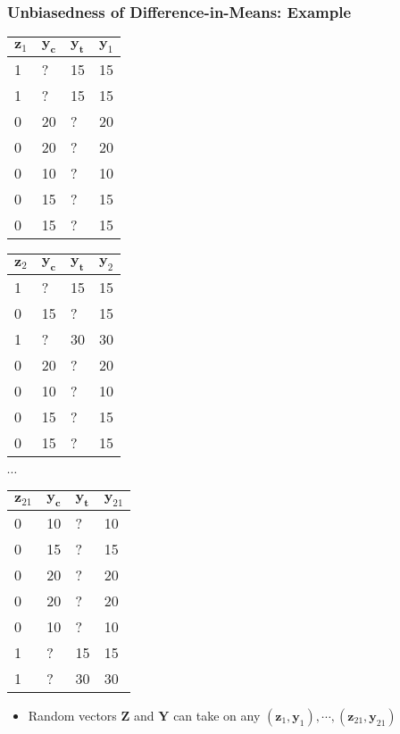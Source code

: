 \documentclass[table, xcolor = {dvipsnames}, 9pt]{beamer}
\theoremstyle{plain}
\begin{document}
\begin{frame}
\frametitle{Unbiasedness of Difference-in-Means: Example}
\begin{table}[H]
\scriptsize
    \begin{tabular}{l|l|l|l|}
    $\bm{z}_1$ & $\bm{y_c}$ & $\bm{y_t}$ & $\bm{y}_1$ \\ \midrule
    1 & ?  & 15  & 15 \\
    1 & ?  & 15  & 15 \\
    0 & 20 & ?   & 20 \\
    0 & 20 & ?   & 20 \\
    0 & 10 & ?   & 10 \\
    0 & 15 & ?   & 15 \\
    0 & 15 & ?   & 15 \\
    \end{tabular}
    \hfill
      \begin{tabular}{l|l|l|l|}
    $\bm{z}_2$ & $\bm{y_c}$ & $\bm{y_t}$ & $\bm{y}_2$ \\ \midrule
    1 &  ? & 15 & 15 \\
    0 & 15 & ?  & 15 \\
    1 & ?  & 30 & 30 \\
    0 & 20 & ?  & 20 \\
    0 & 10 & ?  & 10 \\
    0 & 15 & ?  & 15 \\
    0 & 15 & ?  & 15 \\
    \end{tabular}
     \hfill
     $\cdots $
     \hfill
      \begin{tabular}{l|l|l|l|}
    $\bm{z}_{21}$ & $\bm{y_c}$ & $\bm{y_t}$ & $\bm{y}_{21}$ \\ \midrule
    0 & 10 & ?  & 10 \\
    0 & 15 & ?  & 15 \\
    0 & 20 & ?  & 20 \\
    0 & 20 & ?  & 20 \\
    0 & 10 & ?  & 10 \\
    1 & ?  & 15 & 15 \\
    1 & ?  & 30 & 30 \\
    \end{tabular}
\end{table} 
\begin{itemize}
\item Random vectors $\bm{Z}$ and $\bm{Y}$ can take on any $\left(\bm{z}_1, \bm{y}_1\right), \cdots , \left(\bm{z}_{21}, \bm{y}_{21}\right)$  \vspace{1em} \pause

\end{itemize}
\end{frame}
\end{document}
